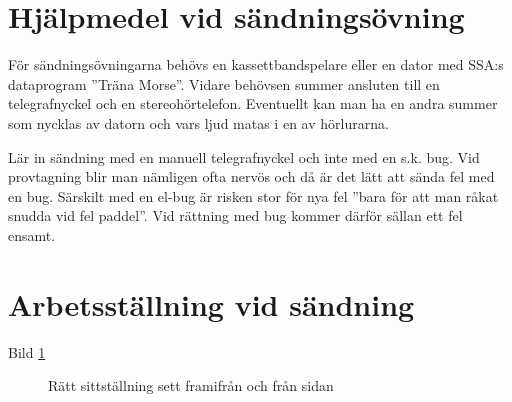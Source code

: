 \section{Hjälpmedel vid sändningsövning}


För sändningsövningarna behövs en kassettbandspelare eller en dator med SSA:s
dataprogram ''Träna Morse''. Vidare behövsen summer ansluten till en
telegrafnyckel och en stereohörtelefon. Eventuellt kan man ha en andra summer
som nycklas av datorn och vars ljud matas i en av hörlurarna.

Lär in sändning med en manuell telegrafnyckel och inte med en s.k. bug. Vid
provtagning blir man nämligen ofta nervös och då är det lätt att sända fel med
en bug. Särskilt med en el-bug är risken stor för nya fel ''bara för att man
råkat snudda vid fel paddel''.  Vid rättning med bug kommer därför sällan ett fel
ensamt.

\section{Arbetsställning vid sändning}

Bild \ref{fig:bild_morse_3_4}

\begin{figure}
  \caption{Rätt sittställning sett framifrån och från sidan}
  \label{fig:bild_morse_3_4}
\end{figure}


